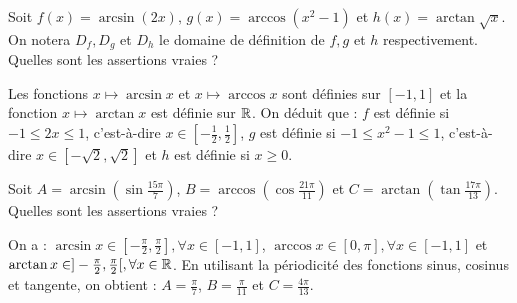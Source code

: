 \begin{question} 

Soit $f(x)= \arcsin (2x), \, g(x)= \arccos (x^2-1) $ et $h(x)= \arctan \sqrt{x}$. On notera $D_f,D_g$ et $D_h$  le domaine de définition de $f, g$ et $h$ respectivement. Quelles sont les assertions vraies ?
\begin{answers}


    
    \good{$D_h=[0,+\infty[$}

    
\end{answers}
\begin{explanations}
Les fonctions $x\mapsto \arcsin x$ et  $x \mapsto \arccos x$ sont définies sur $[-1,1]$ et la fonction  $x \mapsto  \arctan x$ est définie sur $\mathbb{R}$. On déduit que :
$f$ est définie si $-1\le 2x\le 1$, c'est-à-dire $x \in [-\frac{1}{2}, \frac{1}{2}]$, 
$g$ est définie si $-1 \le x^2-1 \le 1$, c'est-à-dire $x\in [-\sqrt 2, \sqrt 2]$ et  $h$ est définie si $x\ge 0$.
\end{explanations}

\end{question}


\begin{question} 

Soit $A=\arcsin (\sin \frac{15\pi}{7})$, $B=\arccos (\cos \frac{21\pi}{11})$ et $C=\arctan (\tan \frac{17\pi}{13})$.  Quelles sont les assertions vraies ?

\begin{answers}



\end{answers}
\begin{explanations}
On a : $\arcsin x \in [-\frac{\pi}{2},\frac{\pi}{2}], \forall x \in [-1,1]$,   $\arccos x \in [0,\pi], \forall x\in [-1,1]$ et $\arctan x \in ]-\frac{\pi}{2},\frac{\pi}{2}[, \forall x \in \mathbb{R}$. En utilisant la périodicité des fonctions sinus, cosinus et tangente, on obtient : $A=\frac{\pi}{7}$, $B=\frac{\pi}{11}$ et $C=\frac{ 4\pi}{13}$.
\end{explanations}


\end{question}





